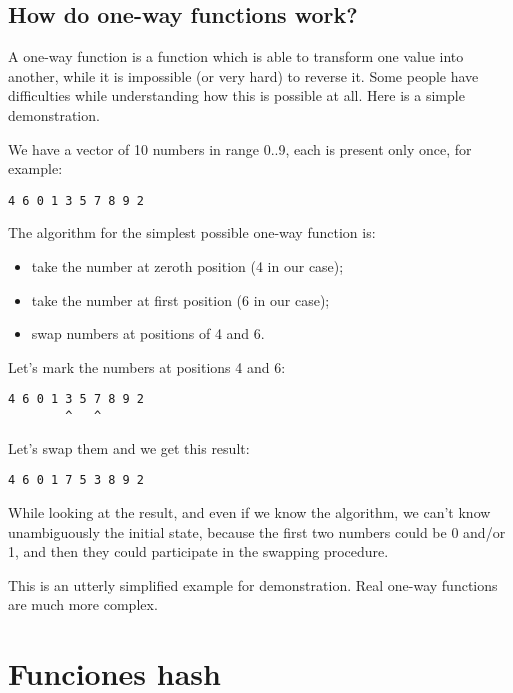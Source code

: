 \section{How do one-way functions work?}

A one-way function is a function which is able to transform one value into another,
while it is impossible (or very hard) to reverse it.
Some people have difficulties while understanding how this is possible at all.
Here is a simple demonstration.

We have a vector of 10 numbers in range 0..9, each is present only once, for example:

\begin{lstlisting}
4 6 0 1 3 5 7 8 9 2
\end{lstlisting}

The algorithm for the simplest possible one-way function is:

\begin{itemize}
\item take the number at zeroth position (4 in our case);
\item take the number at first position (6 in our case);
\item swap numbers at positions of 4 and 6.
\end{itemize}

Let's mark the numbers at positions 4 and 6:

\begin{lstlisting}
4 6 0 1 3 5 7 8 9 2
        ^   ^
\end{lstlisting}

Let's swap them and we get this result:

\begin{lstlisting}
4 6 0 1 7 5 3 8 9 2
\end{lstlisting}

While looking at the result, and even if we know the algorithm, we can't know unambiguously the initial
state, because the first two numbers could be 0 and/or 1, and then they could participate in the swapping procedure.

This is an utterly simplified example for demonstration. Real one-way functions are much more complex.
\fi %


\ifdefined\SPANISH
\newcommand{\HashFuncChapterName}{Funciones hash}

\chapter{\HashFuncChapterName}
\label{hash_func}

